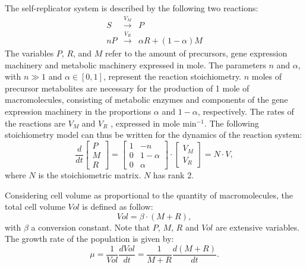 \documentclass[a4paper, 10pt, conference]{ieeeconf}      %
\begin{document}
The self-replicator system is described by the following two reactions:
\begin{eqnarray*}
S  &\overset{V_M}{\longrightarrow}& P \\
nP &\overset{V_R}{\longrightarrow}& \alpha R + (1-\alpha) M
\end{eqnarray*}
The variables $P$, $R$, and $M$ refer to the amount of precursors, gene expression machinery and metabolic machinery expressed in mole.
The parameters $n$ and $\alpha$, with $n \gg 1$ and $\alpha \in [0,1]$, represent the reaction stoichiometry.
$n$ moles of precursor metabolites are necessary for the production of 1 mole of macromolecules, consisting of metabolic enzymes and components of the gene expression machinery in the proportions $\alpha$ and $1 - \alpha$, respectively.
The rates of the reactions are $V_M$ and $V_R$ , expressed in mole min$^{-1}$.
The following stoichiometry model can thus be written for the dynamics of the reaction system:
\begin{equation}
\frac{d}{dt} \left[
\begin{matrix}
P\\
M\\
R
\end{matrix}
\right] = \left[
\begin{matrix}
1 &-n\\
0 & 1 - \alpha\\
0 & \alpha
\end{matrix}
\right] \cdot \left[
\begin{matrix}
V_M \\ V_R
\end{matrix}
\right] = N\cdot V,
\end{equation}
where $N$ is the stoichiometric matrix. $N$ has rank 2.

Considering cell volume as proportional to the quantity of macromolecules, the total cell volume $Vol$ is defined as follow:
\[
\mathit{Vol}=\beta\cdot(M+R),
\]
with $\beta$ a conversion constant. Note that $P$, $M$, $R$ and $\mathit{Vol}$ are extensive variables.
The growth rate of the population is given by:
\[
\mu = \frac{1}{\mathit{Vol}} \frac{d\mathit{Vol}}{dt} = \frac{1}{M+R}\frac{d(M+R)}{dt}.
\]
\end{document}
